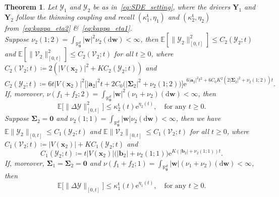 \documentclass[en,oneside,bbfont,article]{amsart}
\newtheorem{theorem}{Theorem}[section]
\theoremstyle{remark}
\theoremstyle{definition}
\theoremstyle{definition}
\newcommand\Y{\bm{\mathcal{Y}}}
\newcommand{\V}{\bm{\mathcal{V}}}
\newcommand\R{\mathbb{R}}
\newcommand\E{\mathds{E}}
\newcommand\e{\mathord{\mathrm{e}}}
\newcommand\1{\mathds{1}}
\renewcommand\le{\leqslant}
\renewcommand\ge{\geqslant}
\newcommand\nf[1]{\normalfont{#1}}
\newcommand{\D}{\mathrm{d}}
\newcommand{\mft}{{\mathfrak{t}}}
\begin{document}
\begin{theorem}
\label{thm:gen_bound_thin}
Let $\Y_1$ and $\Y_2$ be as in~\eqref{eq:SDE_setting}, where the drivers $\bm{Y}_1$ and $\bm{Y}_2$ follow the thinning coupling and recall $(\kappa_1^\mft,\eta_1)$ and $(\kappa_2^\mft,\eta_2)$ from~\eqref{eq:kappa_eta2} \&~\eqref{eq:kappa_eta1}.\\
{\nf{(a)}} Suppose $\nu_2(1;2)=\int_{\R^d_{\bm 0}}|\bm{w}|^2\nu_2(\D\bm{w})<\infty$, then $\E[\|\Y_2\|^2_{[0,t]}]\le C_2(\Y_2;t)$ and $\E[\|\V_2\|^2_{[0,t]}]\le C_2(\V_2;t)$ for all $t\ge 0$, where $C_2(\V_2;t)\coloneqq 2(|V(\bm{x}_2)|^2+KC_2(\Y_2;t))$ and 
\begin{equation}
\label{eq:C_2(Y_2)}
C_2(\Y_2;t)
\coloneqq
6t|V(\bm{x}_2)|^2\big[|\bm{a}_2|^2t
    +2C_0\big(
    |\bm\Sigma_2|^2
    +\nu_2(1;2)\big)\big]\e^{6|\bm{a}_2|^2t^2
+6C_0K^2(2|\bm{\Sigma}_2|^2
+\nu_2(1;2)) t}.
\end{equation}
If, moreover, $\nu(f_1+f_2;2)=\int_{\R^d_{\bm 0}}|\bm{w}|^2(\nu_1+\nu_2)(\D\bm{w})<\infty$, then
\begin{equation}
\label{eq:ER_T_bound_with_GB}
\E\big[\|\Delta\Y\|_{[0,t]}^2\big] 
\le \kappa_2^\mft(t)\e^{\eta_2(t)},
\quad \text{for any }t\ge 0.
\end{equation}
{\nf{(b)}} 
Suppose $\bm{\Sigma}_2=\bm{0}$ and $\nu_2(1;1)=\int_{\R^d_{\bm 0}}|\bm{w}|\nu_2(\D\bm{w})<\infty$, then we have $\E\|\Y_2\|_{[0,t]}\le C_1(\Y_2;t)$ and $\E\|\V_2\|_{[0,t]}\le C_1(\V_2;t)$ for all $t\ge 0$, where $C_1(\V_2;t)\coloneqq |V(\bm{x}_2)|+KC_1(\Y_2;t)$ and 
\begin{equation}
\label{eq:C_1(Y_2)}
C_1(\Y_2;t)
\coloneqq 
t|V(\bm{x}_2)| \big(|\bm{b}_2|
    +\nu_2(1;1)\big)\e^{K(|\bm{b}_2|
+\nu_2(1;1))t}.
\end{equation}
If, moreover, $\bm{\Sigma}_1=\bm{\Sigma}_2=\bm{0}$ and $\nu(f_1+f_2;1)=\int_{\R^d_{\bm 0}}|\bm{w}|(\nu_1+\nu_2)(\D\bm{w})<\infty$, then
\begin{equation}
\label{eq:ER_T_bound_with_GB-FV}
 \E\big[\|\Delta\Y\|_{[0,t]}\big] 
 \le \kappa_1^\mft(t)\e^{\eta_1(t)},
 \quad\text{for any }t\ge 0.
\end{equation}
\end{theorem}
\end{document}
